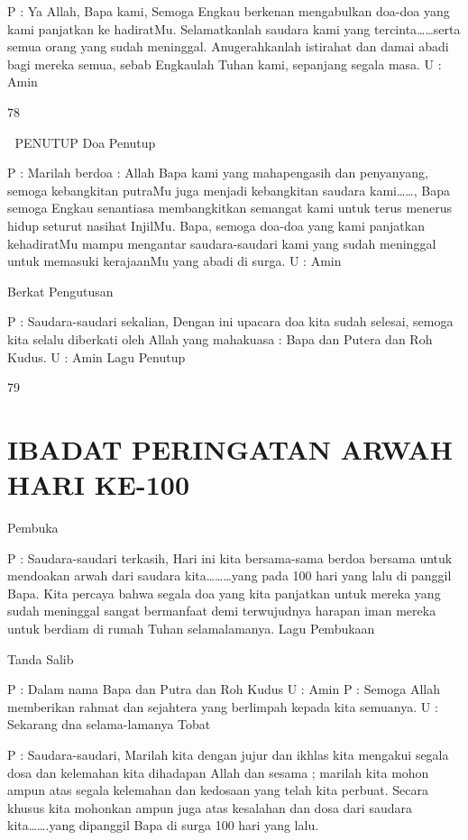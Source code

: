 \documentclass[10pt,a5paper,fancyhdr]{memoir}
\begin{document}
P : Ya Allah, Bapa kami, 
Semoga Engkau berkenan mengabulkan doa-doa yang 
kami panjatkan ke hadiratMu. Selamatkanlah saudara 
kami yang tercinta……serta semua orang yang sudah 
meninggal. Anugerahkanlah istirahat dan damai abadi 
bagi mereka semua, sebab Engkaulah Tuhan kami, 
sepanjang segala masa. 
U : Amin 

78 



PENUTUP 
Doa Penutup 

P : Marilah berdoa : 
Allah Bapa kami yang mahapengasih dan penyanyang, 
semoga kebangkitan putraMu juga menjadi kebangkitan 
saudara kami……, Bapa semoga Engkau senantiasa 
membangkitkan semangat kami untuk terus menerus hidup 
seturut nasihat InjilMu. Bapa, semoga doa-doa yang kami 
panjatkan kehadiratMu mampu mengantar saudara-saudari 
kami yang sudah meninggal untuk memasuki kerajaanMu 
yang abadi di surga. 
U : Amin 

Berkat Pengutusan 

P 
: Saudara-saudari sekalian, 
Dengan ini upacara doa kita sudah selesai, semoga kita 
selalu diberkati oleh Allah yang mahakuasa : Bapa dan 
Putera dan Roh Kudus. 
U : Amin 
Lagu Penutup 

79 



\chapter{IBADAT PERINGATAN ARWAH HARI KE-100}
 
Pembuka 

P 
: Saudara-saudari terkasih, 
Hari ini kita bersama-sama berdoa bersama untuk 
mendoakan arwah dari saudara kita………yang pada 100 
hari yang lalu di panggil Bapa. Kita percaya bahwa segala 
doa yang kita panjatkan untuk mereka yang sudah 
meninggal sangat bermanfaat demi terwujudnya harapan 
iman mereka untuk berdiam di rumah Tuhan selamalamanya. 
Lagu Pembukaan 

Tanda Salib 

P 
: Dalam nama Bapa dan Putra dan Roh Kudus 
U 
: Amin 
P 
: Semoga Allah memberikan rahmat dan sejahtera yang 
berlimpah kepada kita semuanya. 
U 
: Sekarang dna selama-lamanya 
Tobat 

P 
: Saudara-saudari, 
Marilah kita dengan jujur dan ikhlas kita mengakui segala 
dosa dan kelemahan kita dihadapan Allah dan sesama ; marilah 
kita mohon ampun atas segala kelemahan dan kedosaan yang 
telah kita perbuat. Secara khusus kita mohonkan ampun juga 
atas kesalahan dan dosa dari saudara kita…….yang dipanggil 
Bapa di surga 100 hari yang lalu. 
\end{document}
